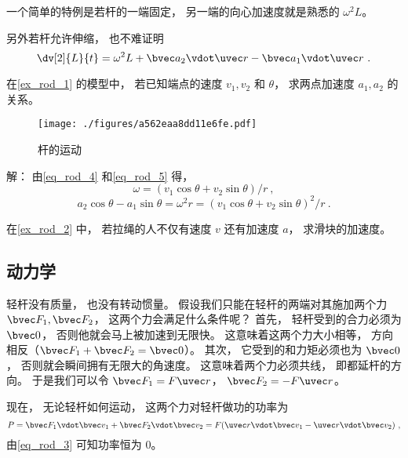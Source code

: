 一个简单的特例是若杆的一端固定， 另一端的向心加速度就是熟悉的 $\omega^2L$。

另外若杆允许伸缩， 也不难证明
\begin{equation}
\dv[2]{L}{t} = \omega^2 L + \bvec a_2 \vdot \uvec r - \bvec a_1 \vdot \uvec r~.
\end{equation}


\begin{example}{}
在\autoref{ex_rod_1} 的模型中， 若已知端点的速度 $v_1, v_2$ 和 $\theta$， 求两点加速度 $a_1, a_2$ 的关系。
\begin{figure}[ht]
\centering
\texttt{[image: ./figures/a562eaa8dd11e6fe.pdf]}
\caption{杆的运动} \label{fig_rod_2}
\end{figure}

解： 由\autoref{eq_rod_4} 和\autoref{eq_rod_5} 得，
\begin{equation}
\omega = (v_1 \cos\theta + v_2 \sin\theta)/r~,
\end{equation}
\begin{equation}
a_2 \cos\theta - a_1 \sin\theta = \omega^2 r = (v_1 \cos\theta + v_2 \sin\theta)^2/r~.
\end{equation}
\end{example}

\begin{exercise}{}
在\autoref{ex_rod_2} 中， 若拉绳的人不仅有速度 $v$ 还有加速度 $a$， 求滑块的加速度。
\end{exercise}

\subsection{动力学}
轻杆没有质量， 也没有转动惯量。 假设我们只能在轻杆的两端对其施加两个力 $\bvec F_1, \bvec F_2$， 这两个力会满足什么条件呢？ 首先， 轻杆受到的合力必须为 $\bvec 0$， 否则他就会马上被加速到无限快。 这意味着这两个力大小相等， 方向相反（$\bvec F_1 + \bvec F_2 = \bvec 0$）。 其次， 它受到的和力矩必须也为 $\bvec 0$， 否则就会瞬间拥有无限大的角速度。 这意味着两个力必须共线， 即都延杆的方向。 于是我们可以令 $\bvec F_1 = F \uvec r$， $\bvec F_2 = -F \uvec r$。

现在， 无论轻杆如何运动， 这两个力对轻杆做功的功率为
\begin{equation}
P = \bvec F_1 \vdot \bvec v_1 + \bvec F_2 \vdot \bvec v_2 = F (\uvec r \vdot \bvec v_1 - \uvec r \vdot \bvec v_2)~,
\end{equation}
由\autoref{eq_rod_3} 可知功率恒为 0。
